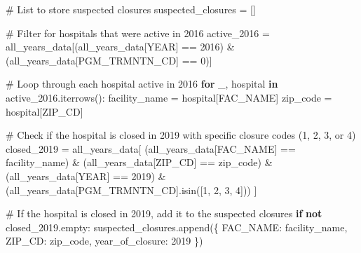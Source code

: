 \documentclass[
  letterpaper,
  DIV=11,
  numbers=noendperiod]{scrartcl}
\newenvironment{Shaded}{\begin{snugshade}}{\end{snugshade}}
\newcommand{\CommentTok}[1]{\textcolor[rgb]{0.37,0.37,0.37}{#1}}
\newcommand{\ControlFlowTok}[1]{\textcolor[rgb]{0.00,0.23,0.31}{\textbf{#1}}}
\newcommand{\DecValTok}[1]{\textcolor[rgb]{0.68,0.00,0.00}{#1}}
\newcommand{\KeywordTok}[1]{\textcolor[rgb]{0.00,0.23,0.31}{\textbf{#1}}}
\newcommand{\NormalTok}[1]{\textcolor[rgb]{0.00,0.23,0.31}{#1}}
\newcommand{\OperatorTok}[1]{\textcolor[rgb]{0.37,0.37,0.37}{#1}}
\newcommand{\StringTok}[1]{\textcolor[rgb]{0.13,0.47,0.30}{#1}}
\begin{document}
\begin{Shaded}
\begin{Highlighting}[]
\CommentTok{\# List to store suspected closures}
\NormalTok{suspected\_closures }\OperatorTok{=}\NormalTok{ []}

\CommentTok{\# Filter for hospitals that were active in 2016}
\NormalTok{active\_2016 }\OperatorTok{=}\NormalTok{ all\_years\_data[(all\_years\_data[}\StringTok{\textquotesingle{}YEAR\textquotesingle{}}\NormalTok{] }\OperatorTok{==} \DecValTok{2016}\NormalTok{) }\OperatorTok{\&}\NormalTok{ (all\_years\_data[}\StringTok{\textquotesingle{}PGM\_TRMNTN\_CD\textquotesingle{}}\NormalTok{] }\OperatorTok{==} \DecValTok{0}\NormalTok{)]}

\CommentTok{\# Loop through each hospital active in 2016}
\ControlFlowTok{for}\NormalTok{ \_, hospital }\KeywordTok{in}\NormalTok{ active\_2016.iterrows():}
\NormalTok{    facility\_name }\OperatorTok{=}\NormalTok{ hospital[}\StringTok{\textquotesingle{}FAC\_NAME\textquotesingle{}}\NormalTok{]}
\NormalTok{    zip\_code }\OperatorTok{=}\NormalTok{ hospital[}\StringTok{\textquotesingle{}ZIP\_CD\textquotesingle{}}\NormalTok{]}
    
    \CommentTok{\# Check if the hospital is closed in 2019 with specific closure codes (1, 2, 3, or 4)}
\NormalTok{    closed\_2019 }\OperatorTok{=}\NormalTok{ all\_years\_data[}
\NormalTok{        (all\_years\_data[}\StringTok{\textquotesingle{}FAC\_NAME\textquotesingle{}}\NormalTok{] }\OperatorTok{==}\NormalTok{ facility\_name) }\OperatorTok{\&}
\NormalTok{        (all\_years\_data[}\StringTok{\textquotesingle{}ZIP\_CD\textquotesingle{}}\NormalTok{] }\OperatorTok{==}\NormalTok{ zip\_code) }\OperatorTok{\&}
\NormalTok{        (all\_years\_data[}\StringTok{\textquotesingle{}YEAR\textquotesingle{}}\NormalTok{] }\OperatorTok{==} \DecValTok{2019}\NormalTok{) }\OperatorTok{\&}
\NormalTok{        (all\_years\_data[}\StringTok{\textquotesingle{}PGM\_TRMNTN\_CD\textquotesingle{}}\NormalTok{].isin([}\DecValTok{1}\NormalTok{, }\DecValTok{2}\NormalTok{, }\DecValTok{3}\NormalTok{, }\DecValTok{4}\NormalTok{]))}
\NormalTok{    ]}
    
    \CommentTok{\# If the hospital is closed in 2019, add it to the suspected closures}
    \ControlFlowTok{if} \KeywordTok{not}\NormalTok{ closed\_2019.empty:}
\NormalTok{        suspected\_closures.append(\{}
            \StringTok{\textquotesingle{}FAC\_NAME\textquotesingle{}}\NormalTok{: facility\_name,}
            \StringTok{\textquotesingle{}ZIP\_CD\textquotesingle{}}\NormalTok{: zip\_code,}
            \StringTok{\textquotesingle{}year\_of\_closure\textquotesingle{}}\NormalTok{: }\DecValTok{2019}
\NormalTok{        \})}


\end{Highlighting}
\end{Shaded}
\end{document}
